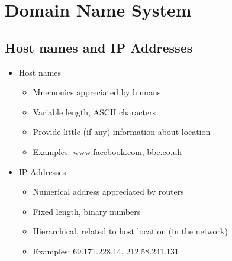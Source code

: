 \chapter{Domain Name System}
\section{Host names and IP Addresses}
\begin{itemize}[nosep]
    \item Host names
          \begin{itemize}[nosep]
              \item Mnemonics appreciated by humans
              \item Variable length, ASCII characters
              \item Provide little (if any) information about location
              \item Examples: www.facebook.com, bbc.co.uh
          \end{itemize}
    \item IP Addresses
          \begin{itemize}[nosep]
              \item Numerical address appreciated by routers
              \item Fixed length, binary numbers
              \item Hierarchical, related to host location (in the network)
              \item Examples: 69.171.228.14, 212.58.241.131
          \end{itemize}
\end{itemize}
